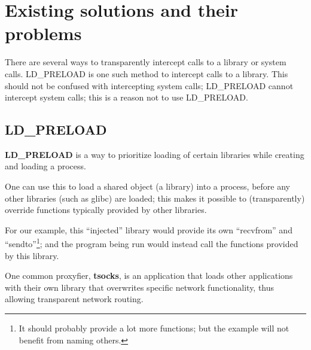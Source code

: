 \documentclass[a4paper, 10pt]{report}
\begin{document}
%



%

\section{Existing solutions and their problems}

There are several ways to transparently intercept calls to a library or
system calls. LD\_PRELOAD is one such method to intercept calls to a library.
This should not be confused with intercepting system calls; LD\_PRELOAD
cannot intercept system calls; this is a reason not to use LD\_PRELOAD.

\subsection{LD\_PRELOAD}

\textbf{LD\_PRELOAD} is a way to prioritize loading of certain libraries
while creating and loading a process.

One can use this to load a shared object (a library) into a process,
before any other libraries (such as glibc) are loaded;
this makes it possible to (transparently) override functions typically
provided by other libraries.

For our example, this ``injected'' library would provide its own
``recvfrom'' and ``sendto''\footnote{It should probably provide
a lot more functions; but the example will not benefit from naming others.};
and the program being run would instead call the functions provided by
this library.

One common proxyfier, \textbf{tsocks}, is an application that loads
other applications with their own library that overwrites specific
network functionality, thus allowing transparent network routing.
\end{document}
